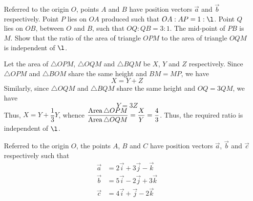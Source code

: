 \documentclass{echw}
\begin{document}
        Referred to the origin $O$, points $A$ and $B$ have position vectors $\vec a$ and $\vec b$ respectively. Point $P$ lies on $OA$ produced such that $OA : AP = 1 : \l$. Point $Q$ lies on $OB$, between $O$ and $B$, such that $OQ:QB = 3:1$. The mid-point of $PB$ is $M$. Show that the ratio of the area of triangle $OPM$ to the area of triangle $OQM$ is independent of $\l$.

    \solution
        \begin{center}
        \end{center}

         Let the area of $\triangle OPM$, $\triangle OQM$ and $\triangle BQM$ be $X$, $Y$ and $Z$ respectively. Since $\triangle OPM$ and $\triangle BOM$ share the same height and $BM = MP$, we have
        \begin{equation*}
            X = Y + Z
        \end{equation*}
        Similarly, since $\triangle OQM$ and $\triangle BQM$ share the same height and $OQ = 3QM$, we have
        \begin{equation*}
            Y = 3Z
        \end{equation*}
        Thus, $X = Y + \dfrac13 Y$, whence $\dfrac{\operatorname{Area} \triangle OPM}{\operatorname{Area} \triangle OQM} = \dfrac{X}{Y} = \dfrac43$. Thus, the required ratio is independent of $\l$.

        Referred to the origin $O$, the points $A$, $B$ and $C$ have position vectors $\vec a$, $\vec b$ and $\vec c$ respectively such that
        \begin{align*}
            \vec a &= 2\vec i + 3\vec j - \vec k\\
            \vec b &= 5\vec i - 2\vec j + 3\vec k\\
            \vec c &= 4\vec i + \vec j - 2\vec k
        \end{align*}
\end{document}
